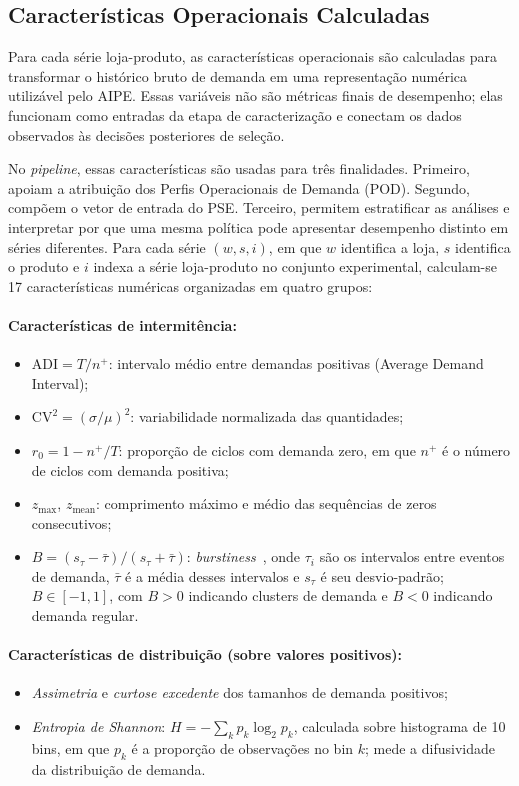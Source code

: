 \subsection{Características Operacionais Calculadas}

Para cada série loja-produto, as características operacionais são calculadas para transformar o histórico bruto de demanda em uma representação numérica utilizável pelo AIPE. Essas variáveis não são métricas finais de desempenho; elas funcionam como entradas da etapa de caracterização e conectam os dados observados às decisões posteriores de seleção.

No \textit{pipeline}, essas características são usadas para três finalidades. Primeiro, apoiam a atribuição dos Perfis Operacionais de Demanda (POD). Segundo, compõem o vetor de entrada do PSE. Terceiro, permitem estratificar as análises e interpretar por que uma mesma política pode apresentar desempenho distinto em séries diferentes. Para cada série $(w, s, i)$, em que $w$ identifica a loja, $s$ identifica o produto e $i$ indexa a série loja-produto no conjunto experimental, calculam-se 17 características numéricas organizadas em quatro grupos:

\paragraph{Características de intermitência:}
\begin{itemize}
  \item $\text{ADI} = T / n^+$: intervalo médio entre demandas positivas (Average Demand Interval);
  \item $\text{CV}^2 = (\sigma/\mu)^2$: variabilidade normalizada das quantidades;
  \item $r_0 = 1 - n^+/T$: proporção de ciclos com demanda zero, em que $n^+$ é o número de ciclos com demanda positiva;
  \item $z_{\max}$, $z_{\text{mean}}$: comprimento máximo e médio das sequências de zeros consecutivos;
  \item $B = (s_\tau - \bar{\tau}) / (s_\tau + \bar{\tau})$: \textit{burstiness}~\citep{GohBarabasi2008Burstiness}, onde $\tau_i$ são os intervalos entre eventos de demanda, $\bar{\tau}$ é a média desses intervalos e $s_\tau$ é seu desvio-padrão; $B \in [-1, 1]$, com $B > 0$ indicando clusters de demanda e $B < 0$ indicando demanda regular.
\end{itemize}

\paragraph{Características de distribuição (sobre valores positivos):}
\begin{itemize}
  \item \textit{Assimetria} e \textit{curtose excedente} dos tamanhos de demanda positivos;
  \item \textit{Entropia de Shannon}: $H = -\sum_k p_k \log_2 p_k$, calculada sobre histograma de 10 bins, em que $p_k$ é a proporção de observações no bin $k$; mede a difusividade da distribuição de demanda.
\end{itemize}


